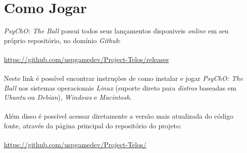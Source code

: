 \section{Como Jogar}
\label{sec:how_to_play}


\textit{PsyChO: The Ball} possui todos seus lançamentos disponiveis \textit{online} em seu próprio repositório, no domínio \textit{Github}:
\\~\\
\url{https://github.com/uspgamedev/Project-Telos/releases}
\\~\\
Neste link é possível encontrar instruções de como instalar e jogar \textit{PsyChO: The Ball} nos sistemas operacionais \textit{Linux} (suporte direto para \textit{distros} baseadas em \textit{Ubuntu} ou \textit{Debian}), \textit{Windows} e \textit{Macintosh}.
\\~\\
Além disso é possível acessar diretamente a versão mais atualizada do código fonte, através da página principal do repositório do projeto:
\\~\\
\url{https://github.com/uspgamedev/Project-Telos/}
